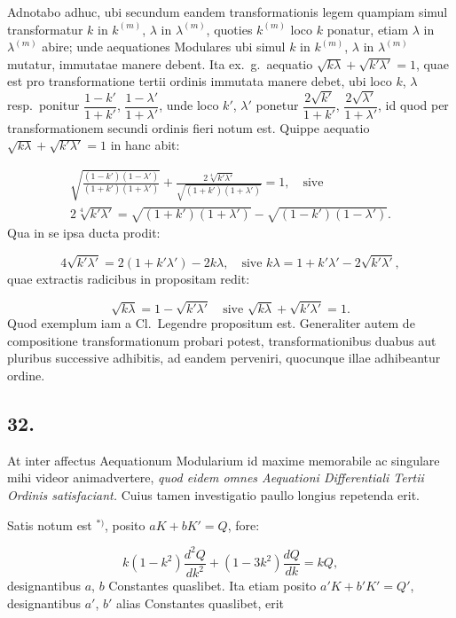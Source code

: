 \documentclass{article}
\begin{document}
Adnotabo adhuc, ubi secundum eandem transformationis legem quampiam simul transformatur $k$ in $k^{(m)}$, $\lambda$ in $\lambda^{(m)}$, quoties $k^{(m)}$ loco $k$ ponatur, etiam $\lambda$ in $\lambda^{(m)}$ abire; unde aequationes Modulares ubi simul $k$ in $k^{(m)}$, $\lambda$ in $\lambda^{(m)}$ mutatur, immutatae manere debent. Ita ex.\ g.\ aequatio $\sqrt{k\lambda}+\sqrt{k'\lambda'}=1$, quae est pro transformatione tertii ordinis immutata manere debet, ubi loco $k$, $\lambda$ resp.\ ponitur $\dfrac{1-k'}{1+k'}$, $\dfrac{1-\lambda'}{1+\lambda'}$, unde loco $k'$, $\lambda'$ ponetur $\dfrac{2\sqrt{k'}}{1+k'}$, $\dfrac{2\sqrt{\lambda'}}{1+\lambda'}$, id quod per transformationem secundi ordinis fieri notum est.
Quippe aequatio $\sqrt{k\lambda}+\sqrt{k'\lambda'}=1$ in hanc abit:

\[
\begin{gathered}
\sqrt{\frac{(1-k')(1-\lambda')}{(1+k')(1+\lambda')}}+\frac{2\sqrt[4]{k'\lambda'}}{\sqrt{(1+k')(1+\lambda')}}=1,\quad\text{sive}\\[1.5ex]
2\sqrt[4]{k'\lambda'}=\sqrt{(1+k')(1+\lambda')}-\sqrt{(1-k')(1-\lambda')}.
\end{gathered}
\]
Qua in se ipsa ducta prodit:

\[
4\sqrt{k'\lambda'}=2(1+k'\lambda')-2k\lambda,\quad\text{sive }k\lambda=1+k'\lambda'-2\sqrt{k'\lambda'},
\]
quae extractis radicibus in propositam redit:

\[
\sqrt{k\lambda}=1-\sqrt{k'\lambda'}\quad\text{sive }\sqrt{k\lambda}+\sqrt{k'\lambda'}=1.
\]
Quod exemplum iam a Cl.\ Legendre propositum est. Generaliter autem de compositione transformationum probari potest, transformationibus duabus aut pluribus successive adhibitis, ad eandem perveniri, quocunque illae adhibeantur ordine.


\subsection*{32.}

At inter affectus Aequationum Modularium id maxime memorabile ac singulare mihi videor animadvertere, \emph{quod eidem omnes Aequationi Differentiali Tertii Ordinis satisfaciant.} Cuius tamen investigatio paullo longius repetenda erit.

Satis notum est ${}^{*)}$, posito $aK+bK'=Q$, fore:

\[
k(1-k^{2})\frac{d^{2}Q}{dk^{2}}+(1-3k^{2})\frac{dQ}{dk}=kQ,
\]
designantibus $a$, $b$ Constantes quaslibet. Ita etiam posito $a'K+b'K'=Q'$, designantibus $a'$, $b'$ alias Constantes quaslibet, erit
\end{document}
